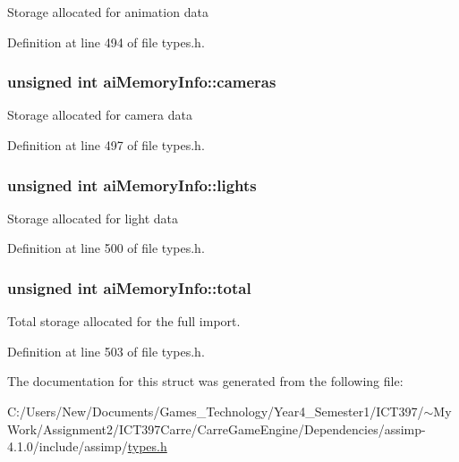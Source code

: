 Storage allocated for animation data 

Definition at line 494 of file types.h.\hypertarget{structai_memory_info_3ddd36d7eabcf989ab72cda2dd3ff015}{
\subsubsection[cameras]{\setlength{\rightskip}{0pt plus 5cm}unsigned int {\bf aiMemoryInfo::cameras}}}
\label{structai_memory_info_3ddd36d7eabcf989ab72cda2dd3ff015}


Storage allocated for camera data 

Definition at line 497 of file types.h.\hypertarget{structai_memory_info_fcd2ccdfab49e2fce989413a362b8d35}{
\subsubsection[lights]{\setlength{\rightskip}{0pt plus 5cm}unsigned int {\bf aiMemoryInfo::lights}}}
\label{structai_memory_info_fcd2ccdfab49e2fce989413a362b8d35}


Storage allocated for light data 

Definition at line 500 of file types.h.\hypertarget{structai_memory_info_590739a4cef4876901d1cf6ff48f01b3}{
\subsubsection[total]{\setlength{\rightskip}{0pt plus 5cm}unsigned int {\bf aiMemoryInfo::total}}}
\label{structai_memory_info_590739a4cef4876901d1cf6ff48f01b3}


Total storage allocated for the full import. 

Definition at line 503 of file types.h.

The documentation for this struct was generated from the following file:\begin{CompactItemize}
\item 
C:/Users/New/Documents/Games\_\-Technology/Year4\_\-Semester1/ICT397/$\sim$My Work/Assignment2/ICT397Carre/CarreGameEngine/Dependencies/assimp-4.1.0/include/assimp/\hyperlink{types_8h}{types.h}\end{CompactItemize}
